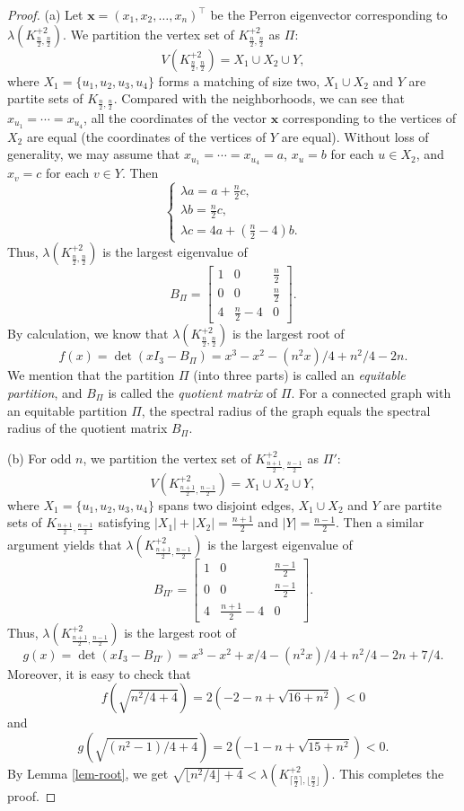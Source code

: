 \documentclass[11pt]{article}
\begin{document}
\begin{proof}
(a) Let $\mathbf{x}=(x_1,x_2,\ldots ,x_n)^{\top}$ be the Perron eigenvector corresponding to $\lambda(K_{\frac{n}{2}, \frac{n}{2}}^{+2})$.
We partition the vertex set of $ K_{\frac{n}{2}, \frac{n}{2}}^{+2}$ as $\Pi$:
\[   V(K_{\frac{n}{2}, \frac{n}{2}}^{+2} )=
X_1 \cup X_2 \cup Y, \]
 where $X_1=\{u_1,u_2,u_3,u_4\}$ forms a matching of size two, 
$X_1\cup X_2$ and $Y$ are partite sets of $K_{\frac{n}{2}, \frac{n}{2}}$.
Compared with the neighborhoods, we can see that $x_{u_1}= \cdots = x_{u_4}$,
all the coordinates of the vector $\mathbf{x}$
corresponding to the vertices of $X_2$  are equal
(the coordinates of the vertices of $Y$ are equal).
Without loss of generality, we may assume that
$x_{u_1}=\cdots =x_{u_4}=a$, $x_u=b$ for each $u\in X_2$, and $x_v=c$
for each $v\in Y$. Then
\[  \begin{cases}
\lambda a= a + \frac{n}{2} c, \\
\lambda b = \frac{n}{2}c, \\
\lambda c = 4a + (\frac{n}{2}-4)b.
\end{cases} \]
Thus, $\lambda(K_{\frac{n}{2}, \frac{n}{2}}^{+2})$ is the largest eigenvalue of
\[  B_{\Pi} =  \begin{bmatrix}
1 & 0 & \frac{n}{2} \\
0 & 0 & \frac{n}{2} \\
4 & \frac{n}{2}-4 & 0
\end{bmatrix}.  \]
By calculation, we know that $\lambda(K_{\frac{n}{2}, \frac{n}{2}}^{+2})$ is the largest  root of
\[ f(x)= \det (xI_3 - B_{\Pi}) 
=x^3 - x^2 - (n^2 x)/4 + n^2/4 - 2 n.  \]
We mention that the partition $\Pi$ (into three parts) 
is called an {\it equitable partition}, and $B_{\Pi}$ is called the {\it quotient matrix} of $\Pi$. 
For a connected graph with an equitable partition $\Pi$, the spectral radius of the graph equals the spectral radius of the quotient matrix $B_{\Pi}$.   


(b) For odd $n$, 
we partition the vertex set of $K_{\frac{n+1}{2}, \frac{n-1}{2}}^{+2}$
as $\Pi'$:
\[  V(K_{\frac{n+1}{2}, \frac{n-1}{2}}^{+2}) = X_1\cup X_2\cup Y, \]
where $X_1=\{u_1,u_2,u_3,u_4\}$ spans 
two disjoint edges, $X_1\cup X_2$ and $Y$
are partite sets of $K_{\frac{n+1}{2}, \frac{n-1}{2}}$
satisfying $|X_1| + |X_2|= \frac{n+1}{2}$
and $|Y|=\frac{n-1}{2}$. Then
a similar argument yields that
$\lambda (K_{\frac{n+1}{2}, \frac{n-1}{2}}^{+2})$ is the largest eigenvalue of
\[  B_{\Pi'}= \begin{bmatrix}
1 & 0 & \frac{n-1}{2} \\
0 & 0 & \frac{n-1}{2} \\
4 & \frac{n+1}{2}-4 & 0
\end{bmatrix}.  \]
Thus, $\lambda (K_{\frac{n+1}{2}, \frac{n-1}{2}}^{+2})$
is the largest root of
\[  g(x)= \det (xI_3- B_{\Pi'})
=x^3 - x^2 + x/4 - (n^2 x)/4 + n^2/4 - 2 n + 7/4.  \] 
Moreover, it is easy to check that 
\[ f(\sqrt{n^2/4 +4}) = 2 (-2 - n + \sqrt{16 + n^2}) <0  \]
and 
\[ g(\sqrt{(n^2-1)/4 +4}) 
=2 (-1 - n + \sqrt{15 + n^2}) <0. \]
By Lemma \ref{lem-root}, we get 
$ \sqrt{\lfloor n^2/4 \rfloor  +4} < 
\lambda (K_{\lceil \frac{n}{2} \rceil, \lfloor \frac{n}{2} \rfloor}^{+2}) $. 
This completes the proof.
\end{proof}
\end{document}
